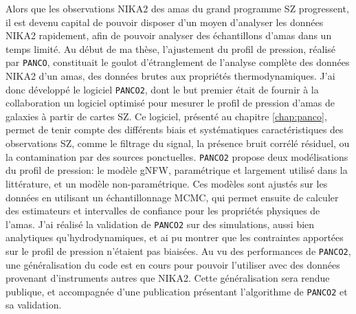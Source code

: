 Alors que les observations NIKA2 des amas du grand programme SZ progressent, il est devenu capital de pouvoir disposer d'un moyen d'analyser les données NIKA2 rapidement, afin de pouvoir analyser des échantillons d'amas dans un temps limité.
Au début de ma thèse, l’ajustement du profil de pression, réalisé par \texttt{PANCO}, constituait le goulot d’étranglement de l’analyse complète des données NIKA2 d’un amas, des données brutes aux propriétés thermodynamiques.
J'ai donc développé le logiciel \texttt{\texttt{PANCO}2}, dont le but premier était de fournir à la collaboration un logiciel optimisé pour mesurer le profil de pression d'amas de galaxies à partir de cartes SZ.
Ce logiciel, présenté au chapitre \ref{chap:panco}, permet de tenir compte des différents biais et systématiques caractéristiques des observations SZ, comme le filtrage du signal, la présence bruit corrélé résiduel, ou la contamination par des sources ponctuelles.
\texttt{PANCO2} propose deux modélisations du profil de pression: le modèle gNFW, paramétrique et largement utilisé dans la littérature, et un modèle non-paramétrique.
Ces modèles sont ajustés sur les données en utilisant un échantillonnage MCMC, qui permet ensuite de calculer des estimateurs et intervalles de confiance pour les propriétés physiques de l'amas.
J'ai réalisé la validation de \texttt{PANCO2} sur des simulations, aussi bien analytiques qu'hydrodynamiques, et ai pu montrer que les contraintes apportées sur le profil de pression n'étaient pas biaisées.
Au vu des performances de \texttt{PANCO2}, une généralisation du code est en cours pour pouvoir l'utiliser avec des données provenant d'instruments autres que NIKA2.
Cette généralisation sera rendue publique, et accompagnée d'une publication présentant l'algorithme de \texttt{PANCO2} et sa validation.

